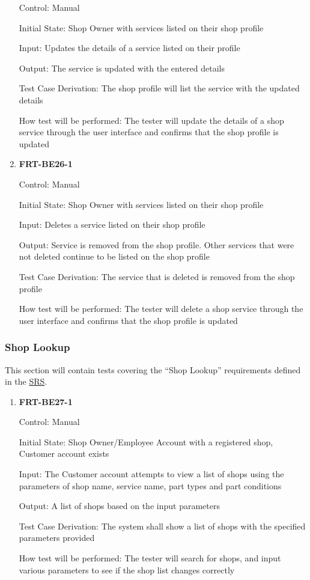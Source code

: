 \documentclass[12pt, titlepage]{article}
\begin{document}
\begin{enumerate}
	      Control: Manual

	      Initial State: Shop Owner with services listed on their shop profile

	      Input: Updates the details of a service listed on their profile

	      Output: The service is updated with the entered details

	      Test Case Derivation: The shop profile will list the service with the updated details

	      How test will be performed: The tester will update the details of a shop service through the user
	      interface and confirms that the shop profile is updated

	\item \textbf{FRT-BE26-1}

	      Control: Manual

	      Initial State: Shop Owner with services listed on their shop profile

	      Input: Deletes a service listed on their shop profile

	      Output: Service is removed from the shop profile. Other services that were not deleted continue to
	      be listed on the shop profile

	      Test Case Derivation: The service that is deleted is removed from the shop profile

	      How test will be performed: The tester will delete a shop service through the user interface and
	      confirms that the shop profile is updated

\end{enumerate}

\subsubsection{Shop Lookup}

This section will contain tests covering the ``Shop Lookup'' requirements defined in the
\href{https://github.com/arkinmodi/project-sayyara/blob/main/docs/SRS/SRS.pdf}{SRS}.

\begin{enumerate}
	\item \textbf{FRT-BE27-1}

	      Control: Manual

	      Initial State: Shop Owner/Employee Account with a registered shop, Customer account exists

	      Input: The Customer account attempts to view a list of shops using the parameters of shop name,
	      service name, part types and part conditions

	      Output: A list of shops based on the input parameters

	      Test Case Derivation: The system shall show a list of shops with the specified parameters provided

	      How test will be performed: The tester will search for shops, and input various parameters to see
	      if the shop list changes correctly

\end{enumerate}
\end{document}

